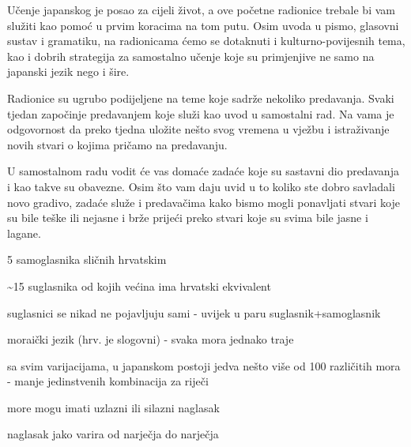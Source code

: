 
\author{Tomislav Mamić}

	
	
	Učenje japanskog je posao za cijeli život, a ove početne radionice trebale bi vam služiti kao pomoć u prvim koracima na tom putu. Osim uvoda u pismo, glasovni sustav i gramatiku, na radionicama ćemo se dotaknuti i kulturno-povijesnih tema, kao i dobrih strategija za samostalno učenje koje su primjenjive ne samo na japanski jezik nego i šire.
	
	
	Radionice su ugrubo podijeljene na teme koje sadrže nekoliko predavanja. Svaki tjedan započinje predavanjem koje služi kao uvod u samostalni rad. Na vama je odgovornost da preko tjedna uložite nešto svog vremena u vježbu i istraživanje novih stvari o kojima pričamo na predavanju.
	
	
	U samostalnom radu vodit će vas domaće zadaće koje su sastavni dio predavanja i kao takve su obavezne. Osim što vam daju uvid u to koliko ste dobro savladali novo gradivo, zadaće služe i predavačima kako bismo mogli ponavljati stvari koje su bile teške ili nejasne i brže prijeći preko stvari koje su svima bile jasne i lagane.
	
	
	\begin{hyou}
		\item 5 samoglasnika sličnih hrvatskim
		\item \textasciitilde15 suglasnika od kojih većina ima hrvatski ekvivalent
		\item suglasnici se nikad ne pojavljuju sami - uvijek u paru suglasnik+samoglasnik
		\item moraički jezik (hrv. je slogovni) - svaka mora jednako traje
		\item sa svim varijacijama, u japanskom postoji jedva nešto više od 100 različitih mora - manje jedinstvenih kombinacija za riječi
		\item more mogu imati uzlazni ili silazni naglasak
		\item naglasak jako varira od narječja do narječja
	\end{hyou}

